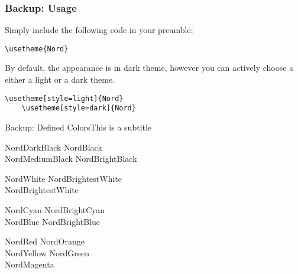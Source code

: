 \documentclass[compress,aspectratio=169]{beamer}
\begin{document}

\begin{frame}[fragile]
  \frametitle{Backup: Usage}
  Simply include the following code in your preamble:

  \begin{lstlisting}[basicstyle = \ttfamily\small]
    \usetheme{Nord}
  \end{lstlisting}

  \bigskip

  By default, the appearance is in dark theme, however you can actively choose a either a light or a
  dark theme.

  \begin{lstlisting}[basicstyle = \ttfamily\small]
    \usetheme[style=light]{Nord}
    \usetheme[style=dark]{Nord}
  \end{lstlisting}

\end{frame}

\begin{frame}{Backup: Defined Colors}{This is a subtitle}
  \begin{description}
  \item[Polar Night]
    \textcolor{NordDarkBlack}{NordDarkBlack} \quad \textcolor{NordBlack}{NordBlack}\\
    \textcolor{NordMediumBlack}{NordMediumBlack} \quad \textcolor{NordBrightBlack}{NordBrightBlack}
  \item[Snow Storm]
    \textcolor{NordWhite}{NordWhite} \quad \textcolor{NordBrighterWhite}{NordBrightestWhite}\\
    \textcolor{NordBrightestWhite}{NordBrightestWhite}
  \item[Forest]
    \textcolor{NordCyan}{NordCyan} \quad \textcolor{NordBrightCyan}{NordBrightCyan}\\
    \textcolor{NordBlue}{NordBlue} \quad \textcolor{NordBrightBlue}{NordBrightBlue}
  \item[Aurora]
    \textcolor{NordRed}{NordRed} \quad \textcolor{NordOrange}{NordOrange} \\
    \textcolor{NordYellow}{NordYellow} \quad \textcolor{NordGreen}{NordGreen} \\
    \textcolor{NordMagenta}{NordMagenta}
  \end{description}
\end{frame}
\end{document}
